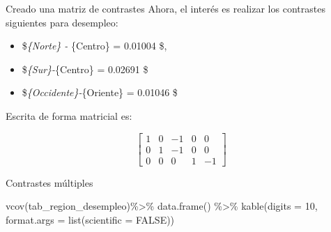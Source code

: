 \documentclass[
  ignorenonframetext,
]{beamer}
\newenvironment{Shaded}{\begin{snugshade}}{\end{snugshade}}
\newcommand{\AttributeTok}[1]{\textcolor[rgb]{0.77,0.63,0.00}{#1}}
\newcommand{\ConstantTok}[1]{\textcolor[rgb]{0.00,0.00,0.00}{#1}}
\newcommand{\DecValTok}[1]{\textcolor[rgb]{0.00,0.00,0.81}{#1}}
\newcommand{\FunctionTok}[1]{\textcolor[rgb]{0.00,0.00,0.00}{#1}}
\newcommand{\NormalTok}[1]{#1}
\newcommand{\SpecialCharTok}[1]{\textcolor[rgb]{0.00,0.00,0.00}{#1}}
\providecommand{\tightlist}{%
  \setlength{\itemsep}{0pt}\setlength{\parskip}{0pt}}
\begin{document}
\begin{frame}{Creado una matriz de contrastes}
\protect\hypertarget{creado-una-matriz-de-contrastes}{}
Ahora, el interés es realizar los contrastes siguientes para desempleo:

\begin{itemize}[<+->]
\tightlist
\item
  \$\emph{\{Norte\} - }\{Centro\} = 0.01004 \$,
\item
  \$\emph{\{Sur\}-}\{Centro\} = 0.02691 \$\\
\item
  \$\emph{\{Occidente\}-}\{Oriente\} = 0.01046 \$
\end{itemize}

Escrita de forma matricial es:

\[
\left[\begin{array}{ccccc}
1 & 0 & -1 & 0 & 0\\
0 & 1 & -1 & 0 & 0\\
0 & 0 & 0 & 1 & -1
\end{array}\right]
\]
\end{frame}

\begin{frame}[fragile]{Contrastes múltiples}
\protect\hypertarget{contrastes-muxfaltiples}{}
\begin{Shaded}
\begin{Highlighting}[]
\FunctionTok{vcov}\NormalTok{(tab\_region\_desempleo)}\SpecialCharTok{\%\textgreater{}\%}
  \FunctionTok{data.frame}\NormalTok{() }\SpecialCharTok{\%\textgreater{}\%} 
  \FunctionTok{kable}\NormalTok{(}\AttributeTok{digits =} \DecValTok{10}\NormalTok{,}
        \AttributeTok{format.args =} \FunctionTok{list}\NormalTok{(}\AttributeTok{scientific =} \ConstantTok{FALSE}\NormalTok{))}
\end{Highlighting}
\end{Shaded}
\end{frame}
\end{document}
